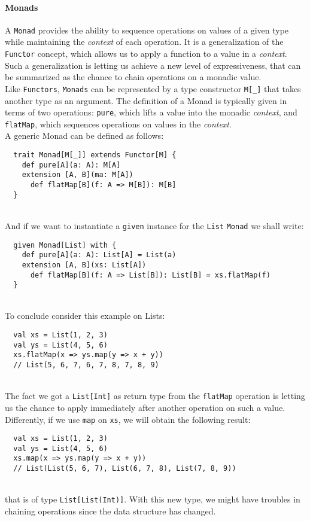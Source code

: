 \paragraph{Monads}
A \texttt{Monad} provides the ability to sequence operations on values of a given type while maintaining the \textit{context} of each operation.
It is a generalization of the \texttt{Functor} concept, which allows us to apply a function to a value in a \textit{context}.
Such a generalization is letting us achieve a new level of expressiveness, that can be summarized as the chance to chain operations on a monadic value.\\
Like \texttt{Functors}, \texttt{Monads} can be represented by a type constructor \texttt{M[\_]} that takes another type as an argument.
The definition of a Monad is typically given in terms of two operations: \texttt{pure}, which lifts a value into the monadic \textit{context}, and \texttt{flatMap}, which sequences operations on values in the \textit{context}.\\
A generic Monad can be defined as follows:
\begin{verbatim}
  trait Monad[M[_]] extends Functor[M] {
    def pure[A](a: A): M[A]
    extension [A, B](ma: M[A])
      def flatMap[B](f: A => M[B]): M[B]
  }
\end{verbatim}\mbox{}\\
And if we want to instantiate a \texttt{given} instance for the \texttt{List} \texttt{Monad} we shall write:
\begin{verbatim}
  given Monad[List] with {
    def pure[A](a: A): List[A] = List(a)
    extension [A, B](xs: List[A])
      def flatMap[B](f: A => List[B]): List[B] = xs.flatMap(f)
  }
\end{verbatim}\mbox{}\\
To conclude consider this example on Lists:
\begin{verbatim}
  val xs = List(1, 2, 3)
  val ys = List(4, 5, 6)
  xs.flatMap(x => ys.map(y => x + y))
  // List(5, 6, 7, 6, 7, 8, 7, 8, 9)
\end{verbatim}\mbox{}\\
The fact we got a \texttt{List[Int]} as return type from the \texttt{flatMap} operation is letting us the chance to apply immediately after another operation on such a value.
Differently, if we use \texttt{map} on \texttt{xs}, we will obtain the following result:
\begin{verbatim}
  val xs = List(1, 2, 3)
  val ys = List(4, 5, 6)
  xs.map(x => ys.map(y => x + y))
  // List(List(5, 6, 7), List(6, 7, 8), List(7, 8, 9))
\end{verbatim}\mbox{}\\
that is of type \texttt{List[List(Int)]}. With this new type, we might have troubles in chaining operations since the data structure has changed.

